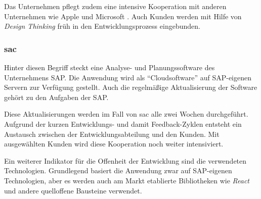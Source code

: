 Das Unternehmen pflegt zudem eine intensive Kooperation mit anderen Unternehmen
wie Apple \cite{Appleund81:online} und Microsoft \cite{Microsof58:online}.
Auch Kunden werden mit Hilfe von \textit{Design Thinking} \cite{SAPDesig64:online} früh in den Entwicklungsprozess eingebunden.



\subsubsection{\ac{sac}}\label{sec:beispiele-sap-sac}
Hinter diesen Begriff steckt eine Analyse- und Planungssoftware des Unternehmens SAP.
Die Anwendung wird als \enquote{Cloudsoftware} auf SAP-eigenen Servern zur Verfügung gestellt.
Auch die regelmäßige Aktualisierung der Software gehört zu den Aufgaben der SAP.

Diese Aktualisierungen werden im Fall von \ac{sac} alle zwei Wochen durchgeführt.
Aufgrund der kurzen Entwicklungs- und damit Feedback-Zyklen entsteht ein Austausch zwischen der Entwicklungsabteilung und den Kunden.
Mit ausgewählten Kunden wird diese Kooperation noch weiter intensiviert.

Ein weiterer Indikator für die Offenheit der Entwicklung sind die verwendeten Technologien.
Grundlegend basiert die Anwendung zwar auf SAP-eigenen Technologien,
aber es werden auch am Markt etablierte Bibliotheken wie \textit{React} und andere quelloffene Bausteine verwendet.
